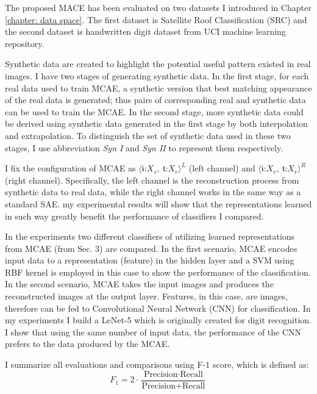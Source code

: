 \documentclass{iitthesis}
\begin{document}

The proposed MACE has been evaluated on two datasets I introduced in Chapter \ref{chapter: data space}. The first dataset is Satellite Roof Classification (SRC) and the second dataset is handwritten digit dataset from UCI machine learning repository.

Synthetic data are created to highlight the potential useful pattern existed in real images. I have two stages
of generating synthetic data. In the first stage, for each real data used to train MCAE, a synthetic version that best matching appearance of the real data is generated; thus pairs of corresponding real and synthetic data can be used to train the MCAE. In the second stage, more synthetic data could be derived using synthetic data generated in the first stage by both interpolation and extrapolation. To distinguish the set of synthetic data used in these two stages, I use abbreviation \textit{Syn I} and \textit{Syn II} to represent them respectively.

 I fix the configuration of MCAE as $\langle\mathfrak{i}\text{:}X_{s},\:\mathfrak{t}\text{:}X_{r}\rangle^{L}$
(left channel) and $\langle\mathfrak{i}\text{:}X_{r},\:\mathfrak{t}\text{:}X_{r}\rangle^{R}$
(right channel). Specifically, the left channel is the reconstruction process from synthetic data to real data,
while the right channel works in the same way as a standard SAE. my experimental results will show that the representations learned in such way greatly benefit the performance of classifiers I compared.

In the experiments two different classifiers of utilizing learned representations from MCAE (from Sec. 3) are compared. In the first scenario, MCAE encodes input data to a representation (feature) in the hidden layer and a
SVM using RBF kernel is employed in this case to show the performance of the classification. In the second scenario, MCAE takes the input images and produces the reconstructed images at the output layer. Features, in this case, are images, therefore can be fed to Convolutional Neural Network (CNN) for classification. In my experiments I build a LeNet-5 \cite{LY:98} which is originally created for digit recognition. I show that using the same number of input data, the performance of the CNN prefers to the data produced by the MCAE.

I summarize all evaluations and comparisons using F-1 score, which
is defined as: 
\begin{equation}
F_{1}=2\cdot\frac{\text{Precision}\cdot\text{Recall}}{\text{Precision}+\text{Recall}}
\end{equation}
\end{document}
